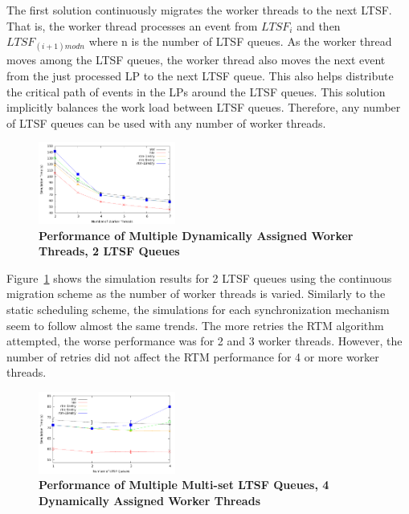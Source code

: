 \documentclass{sig-alternate}
\begin{document}
The first solution continuously migrates the worker threads to the next LTSF.  That is,
the worker thread processes an event from $LTSF_i$ and then $LTSF_{(i+1)mod n}$ where n is
the number of LTSF queues.  As the worker thread moves among the LTSF queues, the worker
thread also moves the next event from the just processed LP to the next LTSF queue.  This
also helps distribute the critical path of events in the LPs around the LTSF queues.  This
solution implicitly balances the work load between LTSF queues.  Therefore, any number of
LTSF queues can be used with any number of worker threads.

\begin{figure}
    \centering
    \graphicspath{ {./figures/} }
    \includegraphics[width=0.4\textwidth,keepaspectratio]{hugeepidemicsim-CONTmig-timeVSthreads-multiset-2schQ}
    \caption{\textbf{Performance of Multiple Dynamically Assigned Worker Threads, 2 LTSF Queues}}
    \label{fig:contThrMig_timeVSthreads_2schQ}
\end{figure}

Figure~\ref{fig:contThrMig_timeVSthreads_2schQ} shows the simulation results for 2 LTSF
queues using the continuous migration scheme as the number of worker threads is varied.
Similarly to the static scheduling scheme, the simulations for each synchronization
mechanism seem to follow almost the same trends.  The more retries the RTM algorithm
attempted, the worse performance was for 2 and 3 worker threads.  However, the number of
retries did not affect the RTM performance for 4 or more worker threads.

\begin{figure}
    \centering
    \graphicspath{ {./figures/} }
    \includegraphics[width=0.4\textwidth,keepaspectratio]{hugeepidemicsim-CONTmig-timeVSschedQs-multiset-4thread}
    \caption{\textbf{Performance of Multiple Multi-set LTSF Queues, 4 Dynamically Assigned Worker Threads}}
    \label{fig:contThrMig_timeVSschq_4threads}
\end{figure}
\end{document}
